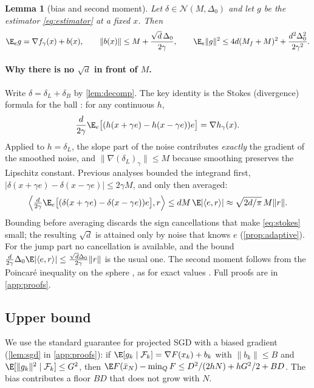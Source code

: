 \documentclass{article} %
\newcommand{\cN}{\mathcal{N}}
\newcommand{\cF}{\mathcal{F}}
\newcommand{\ip}[2]{\langle #1,#2\rangle}
\newcommand{\norm}[1]{\lVert #1\rVert}
\theoremstyle{plain}
\newtheorem{lemma}{Lemma}
\theoremstyle{definition}
\theoremstyle{remark}
\begin{document}
\begin{lemma}[bias and second moment]\label{lem:bias}
Let $\delta\in\cN(M,\Delta_0)$ and let $g$ be the estimator \eqref{eq:estimator} at a fixed $x$. Then
\begin{equation}\label{eq:bias}
  \E_eg=\nabla f_\gamma(x)+b(x),\qquad \norm{b(x)}\le M+\frac{\sqrt d\,\Delta_0}{2\gamma},\qquad
  \E_e\norm{g}^2\le4d(M_f+M)^2+\frac{d^2\Delta_0^2}{2\gamma^2}.
\end{equation}
\end{lemma}

\paragraph{Why there is no $\sqrt d$ in front of $M$.} Write $\delta=\delta_L+\delta_B$ by \cref{lem:decomp}. The key identity is the Stokes (divergence) formula for the ball \citep{flaxman2005online}: for any continuous $h$,
\begin{equation}\label{eq:stokes}
  \frac{d}{2\gamma}\E_e\bigl[(h(x+\gamma e)-h(x-\gamma e))e\bigr]=\nabla h_\gamma(x).
\end{equation}
Applied to $h=\delta_L$, the slope part of the noise contributes \emph{exactly} the gradient of the smoothed noise, and $\norm{\nabla(\delta_L)_\gamma}\le M$ because smoothing preserves the Lipschitz constant. Previous analyses \citep{dvinskikh2022noisy,lobanov2024improved} bounded the integrand first, $|\delta(x+\gamma e)-\delta(x-\gamma e)|\le2\gamma M$, and only then averaged:
\[
\Bigl\langle\tfrac{d}{2\gamma}\E_e\bigl[(\delta(x+\gamma e)-\delta(x-\gamma e))e\bigr],r\Bigr\rangle\le dM\,\E|\ip er|\approx\sqrt{2d/\pi}\,M\norm r .
\]
Bounding before averaging discards the sign cancellations that make \eqref{eq:stokes} small; the resulting $\sqrt d$ is attained only by noise that knows $e$ (\cref{prop:adaptive}). For the jump part no cancellation is available, and the bound $\frac{d}{2\gamma}\Delta_0\E|\ip er|\le\frac{\sqrt d\Delta_0}{2\gamma}\norm r$ is the usual one. The second moment follows from the Poincar\'e inequality on the sphere \citep{ledoux2001concentration}, as for exact values \citep{shamir2017optimal}. Full proofs are in \cref{app:proofs}.

\subsection{Upper bound}

We use the standard guarantee for projected SGD with a biased gradient (\cref{lem:sgd} in \cref{app:proofs}): if $\E[g_k\mid\cF_k]=\nabla F(x_k)+b_k$ with $\norm{b_k}\le B$ and $\E[\norm{g_k}^2\mid\cF_k]\le G^2$, then $\E F(\bar x_N)-\min_QF\le D^2/(2hN)+hG^2/2+BD$. The bias contributes a floor $BD$ that does not grow with $N$.
\end{document}
